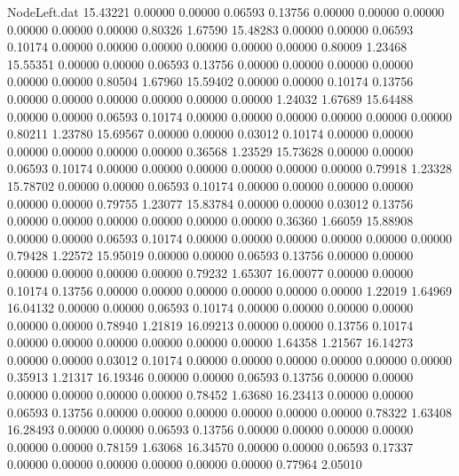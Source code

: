 \begin{filecontents}{NodeLeft.dat}
  15.43221    0.00000    0.00000     0.06593    0.13756    0.00000    0.00000    0.00000    0.00000    0.00000    0.00000    0.80326    1.67590
  15.48283    0.00000    0.00000     0.06593    0.10174    0.00000    0.00000    0.00000    0.00000    0.00000    0.00000    0.80009    1.23468
  15.55351    0.00000    0.00000     0.06593    0.13756    0.00000    0.00000    0.00000    0.00000    0.00000    0.00000    0.80504    1.67960
  15.59402    0.00000    0.00000     0.10174    0.13756    0.00000    0.00000    0.00000    0.00000    0.00000    0.00000    1.24032    1.67689
  15.64488    0.00000    0.00000     0.06593    0.10174    0.00000    0.00000    0.00000    0.00000    0.00000    0.00000    0.80211    1.23780
  15.69567    0.00000    0.00000     0.03012    0.10174    0.00000    0.00000    0.00000    0.00000    0.00000    0.00000    0.36568    1.23529
  15.73628    0.00000    0.00000     0.06593    0.10174    0.00000    0.00000    0.00000    0.00000    0.00000    0.00000    0.79918    1.23328
  15.78702    0.00000    0.00000     0.06593    0.10174    0.00000    0.00000    0.00000    0.00000    0.00000    0.00000    0.79755    1.23077
  15.83784    0.00000    0.00000     0.03012    0.13756    0.00000    0.00000    0.00000    0.00000    0.00000    0.00000    0.36360    1.66059
  15.88908    0.00000    0.00000     0.06593    0.10174    0.00000    0.00000    0.00000    0.00000    0.00000    0.00000    0.79428    1.22572
  15.95019    0.00000    0.00000     0.06593    0.13756    0.00000    0.00000    0.00000    0.00000    0.00000    0.00000    0.79232    1.65307
  16.00077    0.00000    0.00000     0.10174    0.13756    0.00000    0.00000    0.00000    0.00000    0.00000    0.00000    1.22019    1.64969
  16.04132    0.00000    0.00000     0.06593    0.10174    0.00000    0.00000    0.00000    0.00000    0.00000    0.00000    0.78940    1.21819
  16.09213    0.00000    0.00000     0.13756    0.10174    0.00000    0.00000    0.00000    0.00000    0.00000    0.00000    1.64358    1.21567
  16.14273    0.00000    0.00000     0.03012    0.10174    0.00000    0.00000    0.00000    0.00000    0.00000    0.00000    0.35913    1.21317
  16.19346    0.00000    0.00000     0.06593    0.13756    0.00000    0.00000    0.00000    0.00000    0.00000    0.00000    0.78452    1.63680
  16.23413    0.00000    0.00000     0.06593    0.13756    0.00000    0.00000    0.00000    0.00000    0.00000    0.00000    0.78322    1.63408
  16.28493    0.00000    0.00000     0.06593    0.13756    0.00000    0.00000    0.00000    0.00000    0.00000    0.00000    0.78159    1.63068
  16.34570    0.00000    0.00000     0.06593    0.17337    0.00000    0.00000    0.00000    0.00000    0.00000    0.00000    0.77964    2.05010

\end{filecontents}
